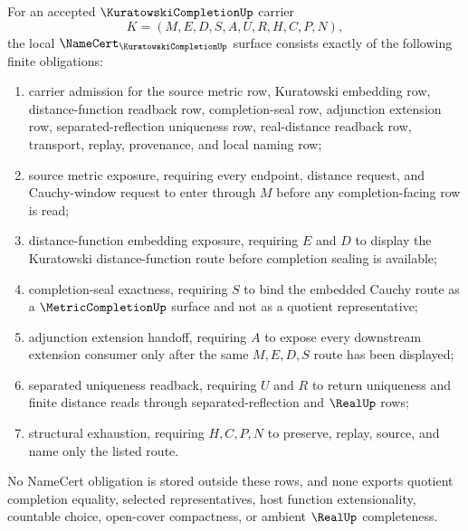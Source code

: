 \begin{theorem}
\label{thm:kuratowski-completion-namecert-obligations}
For an accepted $\KuratowskiCompletionUp$ carrier
$$
K=(M,E,D,S,A,U,R,H,C,P,N),
$$
the local $\NameCert_{\KuratowskiCompletionUp}$ surface consists exactly of the following finite obligations:
\begin{enumerate}
\item carrier admission for the source metric row, Kuratowski embedding row, distance-function readback row, completion-seal row, adjunction extension row, separated-reflection uniqueness row, real-distance readback row, transport, replay, provenance, and local naming row;
\item source metric exposure, requiring every endpoint, distance request, and Cauchy-window request to enter through $M$ before any completion-facing row is read;
\item distance-function embedding exposure, requiring $E$ and $D$ to display the Kuratowski distance-function route before completion sealing is available;
\item completion-seal exactness, requiring $S$ to bind the embedded Cauchy route as a $\MetricCompletionUp$ surface and not as a quotient representative;
\item adjunction extension handoff, requiring $A$ to expose every downstream extension consumer only after the same $M,E,D,S$ route has been displayed;
\item separated uniqueness readback, requiring $U$ and $R$ to return uniqueness and finite distance reads through separated-reflection and $\RealUp$ rows;
\item structural exhaustion, requiring $H,C,P,N$ to preserve, replay, source, and name only the listed route.
\end{enumerate}
No NameCert obligation is stored outside these rows, and none exports quotient completion equality, selected representatives, host function extensionality, countable choice, open-cover compactness, or ambient $\RealUp$ completeness.
\end{theorem}
